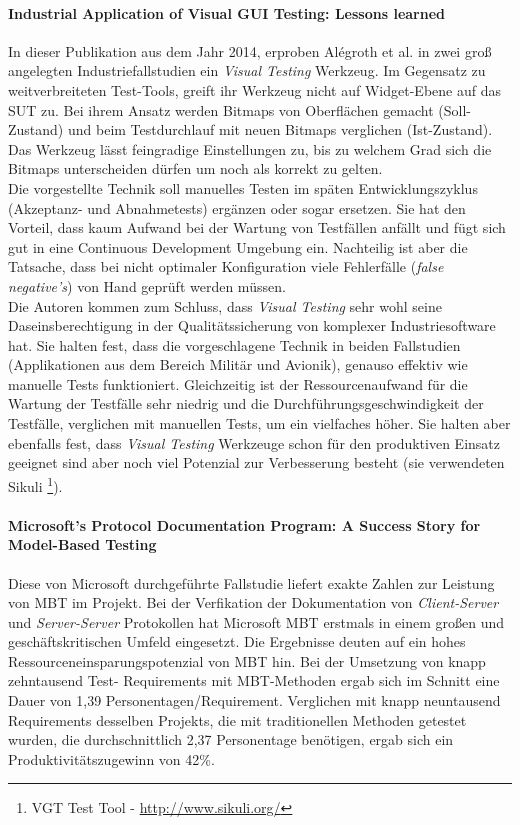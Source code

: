 \paragraph{Industrial Application of Visual GUI Testing: Lessons learned \cite{alegroth_industrial_2014}}In dieser Publikation aus dem Jahr 2014, erproben Alégroth et al. in zwei groß angelegten Industriefallstudien ein \textit{Visual Testing} Werkzeug. Im Gegensatz zu weitverbreiteten Test-Tools, greift ihr Werkzeug nicht auf Widget-Ebene auf das SUT zu. Bei ihrem Ansatz werden Bitmaps von Oberflächen gemacht (Soll-Zustand) und beim Testdurchlauf mit neuen Bitmaps verglichen (Ist-Zustand). Das Werkzeug lässt feingradige Einstellungen zu, bis zu welchem Grad sich die Bitmaps unterscheiden dürfen um noch als korrekt zu gelten.\\
Die vorgestellte Technik soll manuelles Testen im späten Entwicklungszyklus (Akzeptanz- und Abnahmetests) ergänzen oder sogar ersetzen. Sie hat den Vorteil, dass kaum Aufwand bei der Wartung von Testfällen anfällt und fügt sich gut in eine Continuous Development Umgebung ein. Nachteilig ist aber die Tatsache, dass bei nicht optimaler Konfiguration viele Fehlerfälle (\textit{false negative's}) von Hand geprüft werden müssen.\\
Die Autoren kommen zum Schluss, dass \textit{Visual Testing} sehr wohl seine Daseinsberechtigung in der Qualitätssicherung von komplexer Industriesoftware hat. Sie halten fest, dass die vorgeschlagene Technik in beiden Fallstudien (Applikationen aus dem Bereich Militär und Avionik), genauso effektiv wie manuelle Tests funktioniert. Gleichzeitig ist der Ressourcenaufwand für die Wartung der Testfälle sehr niedrig und die Durchführungsgeschwindigkeit der Testfälle, verglichen mit manuellen Tests, um ein vielfaches höher. Sie halten aber ebenfalls fest, dass \textit{Visual Testing} Werkzeuge schon für den produktiven Einsatz geeignet sind aber noch viel Potenzial zur Verbesserung besteht (sie verwendeten Sikuli \footnote{VGT Test Tool - \url{http://www.sikuli.org/}}).

\paragraph{Microsoft’s Protocol Documentation Program: A Success Story for Model-Based Testing\cite{grieskamp_microsofts_2010}} Diese von Microsoft durchgeführte Fallstudie liefert exakte Zahlen zur Leistung von MBT im Projekt. Bei der Verfikation der Dokumentation von \textit{Client-Server} und \textit{Server-Server} Protokollen hat Microsoft MBT erstmals in einem großen und geschäftskritischen Umfeld eingesetzt. Die Ergebnisse deuten auf ein hohes Ressourceneinsparungspotenzial von MBT hin. Bei der Umsetzung von knapp zehntausend Test- Requirements mit MBT-Methoden ergab sich im Schnitt eine Dauer von 1,39 Personentagen/Requirement. Verglichen mit knapp neuntausend Requirements desselben Projekts, die mit traditionellen Methoden getestet wurden, die durchschnittlich 2,37 Personentage benötigen, ergab sich ein Produktivitätszugewinn von 42\%.

